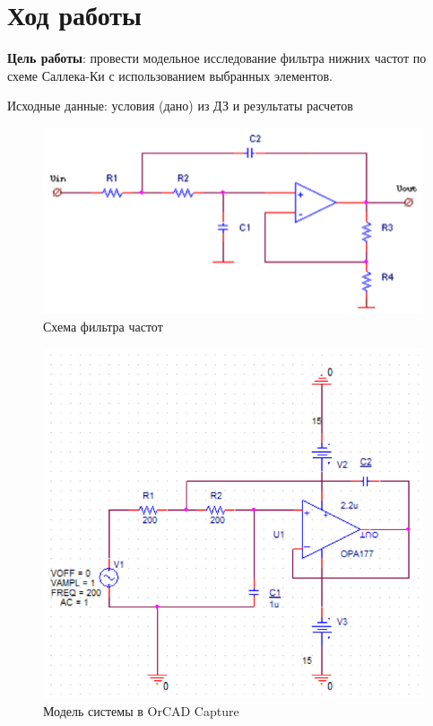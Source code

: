 \chapter{Ход работы}

\textbf{Цель работы}: провести модельное исследование фильтра нижних частот по схеме Саллека-Ки с использованием выбранных элементов.

Исходные данные: условия (дано) из ДЗ и результаты расчетов

\begin{figure}[h!]
	\centering
	\caption{Схема фильтра частот}
	\includegraphics{images/1.png}
\end{figure}


\begin{figure}[h!]
	\centering
	\caption{Модель системы в OrCAD Capture}
	\includegraphics{images/2.png}
\end{figure}

